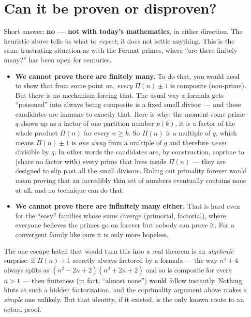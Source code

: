\documentclass[11pt,a4paper]{article}
\newcommand{\Part}{\Pi}                 %
\begin{document}
\section{Can it be proven or disproven?}\label{sec:proof}

Short answer: \textbf{no --- not with today's mathematics}, in either direction.
The heuristic above tells us what to \emph{expect}; it does not settle anything.
This is the same frustrating situation as with the Fermat primes, where ``are
there finitely many?'' has been open for centuries.

\begin{itemize}[leftmargin=1.4em]
\item \textbf{We cannot prove there are finitely many.} To do that, you would
  need to show that from some point on, \emph{every} $\Part(n)\pm1$ is composite
  (non-prime). But there is no mechanism forcing that. The usual way a formula
  gets ``poisoned'' into always being composite is a fixed small divisor --- and
  these candidates are immune to exactly that. Here is why: the moment some prime
  $q$ shows up as a factor of one partition number $p(k)$, it is a factor of the
  whole product $\Part(n)$ for every $n\ge k$. So $\Part(n)$ is a multiple of
  $q$, which means $\Part(n)\pm1$ is \emph{one away} from a multiple of $q$ and
  therefore \emph{never} divisible by $q$. In other words the candidates are, by
  construction, coprime to (share no factor with) every prime that lives inside
  $\Part(n)$ --- they are designed to slip past all the small divisors. Ruling
  out primality forever would mean proving that an incredibly thin set of numbers
  eventually contains none at all, and no technique can do that.
\item \textbf{We cannot prove there are infinitely many either.} That is hard
  even for the ``easy'' families whose sums diverge (primorial, factorial), where
  everyone believes the primes go on forever but nobody can prove it. For a
  convergent family like ours it is only more hopeless.
\end{itemize}

\noindent
The one escape hatch that would turn this into a real theorem is an
\emph{algebraic} surprise: if $\Part(n)\pm1$ secretly always factored by a formula
--- the way $n^4+4$ always splits as $(n^2-2n+2)(n^2+2n+2)$ and so is composite
for every $n>1$ --- then finiteness (in fact, ``almost none'') would follow
instantly. Nothing hints at such a hidden factorization, and the coprimality
argument above makes a \emph{simple} one unlikely. But that identity, if it
existed, is the only known route to an actual proof.
\end{document}
